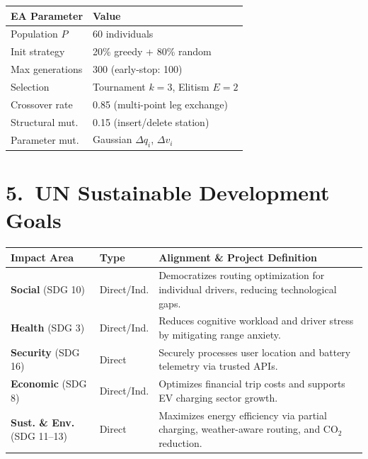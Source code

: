 \documentclass[a0,portrait]{a0poster}
\begin{document}
\begin{minipage}[t][83cm]{0.31\linewidth}
\renewcommand{\arraystretch}{1.2}
\small
\begin{tabularx}{\linewidth}{@{}lX@{}}
\toprule
\textbf{EA Parameter}    & \textbf{Value}\\
\midrule
Population $P$           & 60 individuals\\
Init strategy            & 20\% greedy + 80\% random\\
Max generations          & 300 (early-stop: 100)\\
Selection                & Tournament $k\!=\!3$, Elitism $E\!=\!2$\\
Crossover rate           & 0.85 (multi-point leg exchange)\\
Structural mut.          & 0.15 (insert/delete station)\\
Parameter mut.           & Gaussian $\Delta q_i$, $\Delta v_i$\\
\end{tabularx}

\section*{5.\ UN Sustainable Development Goals}
\renewcommand{\arraystretch}{1.2}
\small
\begin{tabularx}{\linewidth}{@{}l l X@{}}
\toprule
\textbf{Impact Area} & \textbf{Type} & \textbf{Alignment \& Project Definition} \\
\midrule
\textbf{Social} (SDG 10) & Direct/Ind. & Democratizes routing optimization for individual drivers, reducing technological gaps. \\
\textbf{Health} (SDG 3) & Direct/Ind. & Reduces cognitive workload and driver stress by mitigating range anxiety. \\
\textbf{Security} (SDG 16) & Direct & Securely processes user location and battery telemetry via trusted APIs. \\
\textbf{Economic} (SDG 8) & Direct/Ind. & Optimizes financial trip costs and supports EV charging sector growth. \\
\textbf{Sust. \& Env.} (SDG 11--13) & Direct & Maximizes energy efficiency via partial charging, weather-aware routing, and CO$_2$ reduction. \\
\bottomrule
\end{tabularx}

\vfill
\end{minipage}
\hfill
\end{document}
